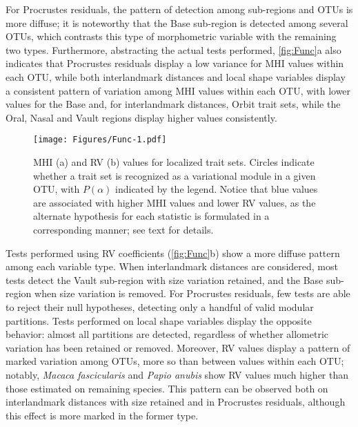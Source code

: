 \documentclass[12pt,]{article}
\begin{document}
For Procrustes residuals, the pattern of detection among sub-regions and
OTUs is more diffuse; it is noteworthy that the Base sub-region is
detected among several OTUs, which contrasts this type of morphometric
variable with the remaining two types. Furthermore, abstracting the
actual tests performed, \autoref{fig:Func}a also indicates that
Procrustes residuals display a low variance for MHI values within each
OTU, while both interlandmark distances and local shape variables
display a consistent pattern of variation among MHI values within each
OTU, with lower values for the Base and, for interlandmark distances,
Orbit trait sets, while the Oral, Nasal and Vault regions display higher
values consistently.

\begin{figure}[htbp]
\centering
\texttt{[image: Figures/Func-1.pdf]}
\caption{MHI (a) and RV (b) values for localized trait sets. Circles
indicate whether a trait set is recognized as a variational module in a
given OTU, with $P(\alpha)$ indicated by the legend. Notice that blue
values are associated with higher MHI values and lower RV values, as the
alternate hypothesis for each statistic is formulated in a corresponding
manner; see text for details. \label{fig:Func}}
\end{figure}

Tests performed using RV coefficients (\autoref{fig:Func}b) show a more
diffuse pattern among each variable type. When interlandmark distances
are considered, most tests detect the Vault sub-region with size
variation retained, and the Base sub-region when size variation is
removed. For Procrustes residuals, few tests are able to reject their
null hypotheses, detecting only a handful of valid modular partitions.
Tests performed on local shape variables display the opposite behavior:
almost all partitions are detected, regardless of whether allometric
variation has been retained or removed. Moreover, RV values display a
pattern of marked variation among OTUs, more so than between values
within each OTU; notably, \emph{Macaca fascicularis} and \emph{Papio
anubis} show RV values much higher than those estimated on remaining
species. This pattern can be observed both on interlandmark distances
with size retained and in Procrustes residuals, although this effect is
more marked in the former type.
\end{document}
